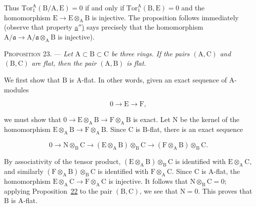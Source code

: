 Thus $\mathrm{Tor}_1^\mathrm{A}(\mathrm{B}/\mathrm{A},\mathrm{E})=0$ if and only if
$\mathrm{Tor}_1^\mathrm{A}(\mathrm{B},\mathrm{E})=0$ and the homomorphism $\mathrm{E}\to \mathrm{E}\otimes_\mathrm{A}\mathrm{B}$ is
injective. The proposition follows immediately (observe that property
\hyperref[gaga:prop:22:item:aa]{a$''$)} says precisely that the homomorphism
$\mathrm{A}/\mathfrak{a}\to \mathrm{A}/\mathfrak{a}\otimes_\mathrm{A}\mathrm{B}$ is injective).

\textsc{Proposition 23}. --- \emph{Let
$\mathrm{A}\subset \mathrm{B}\subset \mathrm{C}$ be three rings. If the pairs $(\mathrm{A},\mathrm{C})$ and $(\mathrm{B},\mathrm{C})$ are
flat, then the pair $(\mathrm{A},\mathrm{B})$ is flat.}

We first show that $\mathrm{B}$ is $\mathrm{A}$-flat. In other words, given an exact sequence of
$\mathrm{A}$-modules

\begin{equation*}
0\longrightarrow \mathrm{E}\longrightarrow \mathrm{F},
\end{equation*}

we must show that
$0\to \mathrm{E}\otimes_\mathrm{A}\mathrm{B}\to \mathrm{F}\otimes_\mathrm{A}\mathrm{B}$ is exact. Let $\mathrm{N}$ be the kernel of the
homomorphism $\mathrm{E}\otimes_\mathrm{A}\mathrm{B}\to \mathrm{F}\otimes_\mathrm{A}\mathrm{B}$. Since $\mathrm{C}$ is $\mathrm{B}$-flat, there is
an exact sequence

\begin{equation*}
0\longrightarrow \mathrm{N}\otimes_\mathrm{B}\mathrm{C}\longrightarrow
(\mathrm{E}\otimes_\mathrm{A}\mathrm{B})\otimes_\mathrm{B}\mathrm{C}\longrightarrow(\mathrm{F}\otimes_\mathrm{A}\mathrm{B})\otimes_\mathrm{B}\mathrm{C}.
\end{equation*}

By associativity of the tensor product, $(\mathrm{E}\otimes_\mathrm{A}\mathrm{B})\otimes_\mathrm{B}\mathrm{C}$ is
identified with $\mathrm{E}\otimes_\mathrm{A}\mathrm{C}$, and similarly $(\mathrm{F}\otimes_\mathrm{A}\mathrm{B})\otimes_\mathrm{B}\mathrm{C}$ is
identified with $\mathrm{F}\otimes_\mathrm{A}\mathrm{C}$. Since $\mathrm{C}$ is $\mathrm{A}$-flat, the homomorphism
$\mathrm{E}\otimes_\mathrm{A}\mathrm{C}\to \mathrm{F}\otimes_\mathrm{A}\mathrm{C}$ is injective. It follows that $\mathrm{N}\otimes_\mathrm{B}\mathrm{C}=0$;
applying Proposition~\hyperref[gaga:prop:22]{22} to the pair $(\mathrm{B},\mathrm{C})$, we see
that $\mathrm{N}=0$. This proves that $\mathrm{B}$ is $\mathrm{A}$-flat.

